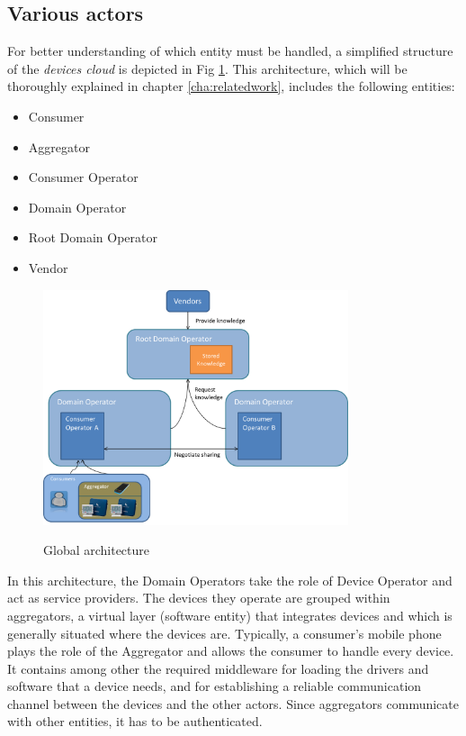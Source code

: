 \subsection{Various actors} 
For better understanding of which entity must be handled, a simplified structure of the \emph{devices cloud} is depicted in Fig \ref*{fig:concept__architecture}. This architecture, which will be thoroughly explained in chapter \ref{cha:relatedwork}, includes the following entities:
\begin{itemize}
	\item Consumer
	\item Aggregator
	\item Consumer Operator
	\item Domain Operator
	\item Root Domain Operator
	\item Vendor
\end{itemize}

\begin{figure}[!ht]
	\centering
	\includegraphics[width=0.8\textwidth]{images/design.png}\\
	\caption{Global architecture}
	\label{fig:concept__architecture}
\end{figure}

In this architecture, the Domain Operators take the role of Device Operator and act as service providers. The devices they operate are grouped within aggregators, a virtual layer (software entity) that integrates devices and which is generally situated where the devices are. Typically, a consumer's mobile phone plays the role of the Aggregator and allows the consumer to handle every device. It contains among other the required middleware for loading the drivers and software that a device needs, and for establishing a reliable communication channel between the devices and the other actors. Since aggregators communicate with other entities, it has to be authenticated.

